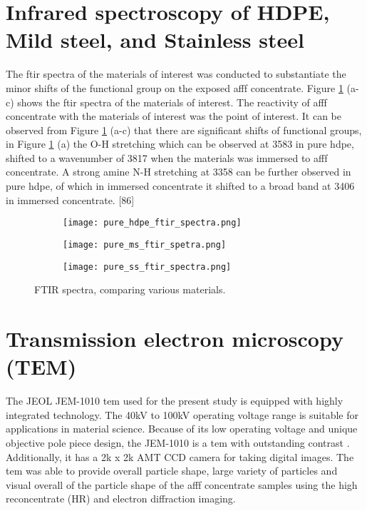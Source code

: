 \section{Infrared spectroscopy of HDPE, Mild steel, and Stainless steel}  
The \acrshort{ftir} spectra of the materials of interest was conducted to substantiate the minor shifts of the functional group on the exposed \acrshort{afff} concentrate. Figure \ref{ch5:figure:materials} (a-c) shows the \acrshort{ftir} spectra of the materials of interest. The reactivity of \acrshort{afff} concentrate with the materials of interest was the point of interest. It can be observed from Figure \ref{ch5:figure:materials} (a-c) that there are significant shifts of functional groups, in Figure \ref{ch5:figure:materials} (a) the O-H stretching which can be observed at 3583 in pure \acrshort{hdpe}, shifted to a wavenumber of 3817 when the materials was immersed to \acrshort{afff} concentrate. A strong amine N-H stretching at 3358 can be further observed in pure \acrshort{hdpe}, of which in immersed concentrate it shifted to a broad band at 3406 in immersed concentrate. [86]

\begin{figure}[H]
\centering

\begin{subfigure}{.45\textwidth}
    \texttt{[image: pure\_hdpe\_ftir\_spectra.png]}
    \caption{}
\end{subfigure}
\begin{subfigure}{.45\textwidth}
    \texttt{[image: pure\_ms\_ftir\_spetra.png]}
    \caption{}
\end{subfigure}
\begin{subfigure}{.45\textwidth}
    \texttt{[image: pure\_ss\_ftir\_spectra.png]}
    \caption{}
\end{subfigure}

\caption{FTIR spectra, comparing various materials.}
\label{ch5:figure:materials}
\end{figure}

\section{Transmission electron microscopy (TEM)}
The JEOL JEM-1010 \acrshort{tem} used for the present study is equipped with highly integrated technology. The 40kV to 100kV operating voltage range is suitable for applications in material science. Because of its low operating voltage and unique objective pole piece design, the JEM-1010 is a \acrshort{tem} with outstanding contrast \cite{krimm1986vibrational}. Additionally, it has a 2k x 2k AMT CCD camera for taking digital images. The \acrshort{tem} was able to provide overall particle shape, large variety of particles and visual overall of the particle shape of the \acrshort{afff} concentrate samples using the high reconcentrate (HR) and electron diffraction imaging.  

